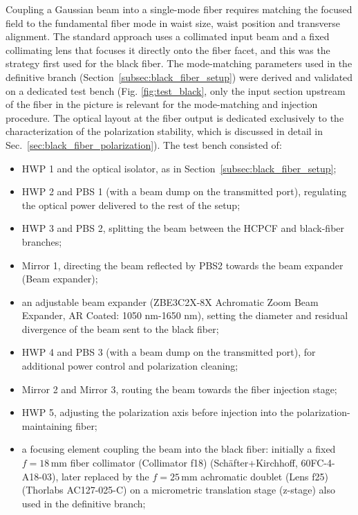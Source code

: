 Coupling a Gaussian beam into a single-mode fiber requires matching the focused field to the fundamental fiber mode in waist size, waist position and transverse alignment. The standard approach uses a collimated input beam and a fixed collimating lens that focuses it directly onto the fiber facet, and this was the strategy first used for the black fiber. The mode-matching parameters used in the definitive branch (Section~\ref{subsec:black_fiber_setup}) were derived and validated on a dedicated test bench (Fig. \ref{fig:test_black}, only the input section upstream of the fiber in the picture is relevant for the mode-matching and injection procedure. The optical layout at the fiber output is dedicated exclusively to the characterization of the polarization stability, which is discussed in detail in Sec.~\ref{sec:black_fiber_polarization}). The test bench consisted of:
\begin{itemize}
    \item HWP 1 and the optical isolator, as in Section~\ref{subsec:black_fiber_setup};
    \item HWP 2 and PBS 1 (with a beam dump on the transmitted port), regulating the optical power delivered to the rest of the setup;
    \item HWP 3 and PBS 2, splitting the beam between the HCPCF and black-fiber branches;
    \item Mirror 1, directing the beam reflected by PBS2 towards the beam expander (Beam expander);
    \item an adjustable beam expander (ZBE3C2X-8X Achromatic Zoom Beam Expander, AR Coated: 1050 nm-1650 nm), setting the diameter and residual divergence of the beam sent to the black fiber;
    \item HWP 4 and PBS 3 (with a beam dump on the transmitted port), for additional power control and polarization cleaning;
    \item Mirror 2 and Mirror 3, routing the beam towards the fiber injection stage;
    \item HWP 5, adjusting the polarization axis before injection into the polarization-maintaining fiber;
    \item a focusing element coupling the beam into the black fiber: initially a fixed $f=18\,\mathrm{mm}$ fiber collimator (Collimator f18) (Sch\"{a}fter+Kirchhoff, 60FC-4-A18-03), later replaced by the $f=25\,\mathrm{mm}$ achromatic doublet (Lens f25) (Thorlabs AC127-025-C) on a micrometric translation stage (z-stage) also used in the definitive branch;
\end{itemize}

